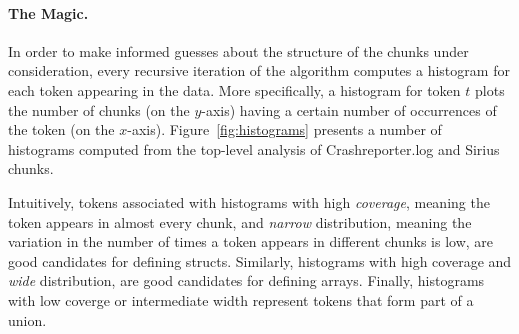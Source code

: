 

\paragraph*{The Magic.}
In order to make informed guesses about the structure of the chunks
under consideration, every recursive iteration of the algorithm computes 
a histogram for each token appearing in the data.
More specifically, a histogram for token $t$
plots the number of chunks (on the $y$-axis)
having a certain number of occurrences of the token (on the $x$-axis). 
Figure~\ref{fig:histograms} presents a number of histograms computed
from the top-level analysis of Crashreporter.log and Sirius chunks.

Intuitively, tokens associated 
with histograms with high {\em coverage}, meaning the token appears
in almost every chunk, and {\em narrow} distribution, meaning the variation in
the number of times a token appears in different chunks is low, are
good candidates for defining structs.  Similarly, histograms with
high coverage and {\em wide} distribution, are good candidates for defining
arrays.  Finally, histograms with low coverge or intermediate width
represent tokens that form part of a union.  


\begin {figure*}
\begin{center}
\begin{minipage}[t]{0.59\columnwidth}
\end{minipage}
\hfill
\begin{minipage}[t]{0.53\columnwidth}
\end{minipage}
\hfill
\begin{minipage}[t]{0.295\columnwidth}
\end{minipage}
\hfill
\begin{minipage}[t]{0.59\columnwidth}
\end{minipage}
%
%
%
\caption{Histograms (a), (b), (c), (d), (e), (f) and
(g) are generated from top-level analysis of Crashreporter.log tokens.
The corresponding tokens are (a) {\tt [*]}, 
(b)  {\tt Pint}, (c) {\tt PDate}, (d) {\tt PTime}, (e) {\tt -}, (f) {\tt Palpha} and
(g) {\tt Pwhite}.  Histograms (h) {\tt Palpha}, (i) {\tt Pint}, and 
(j) {\tt Pwhite} are generated from analysis of Crashreporter.log from
set 1 (the second level of recursion).  Histogram (k) is generated from
top-level analysis of the {\tt |} token from Dibbler.1000.}
\label{fig:histograms} 
\end{center}
\end{figure*}

